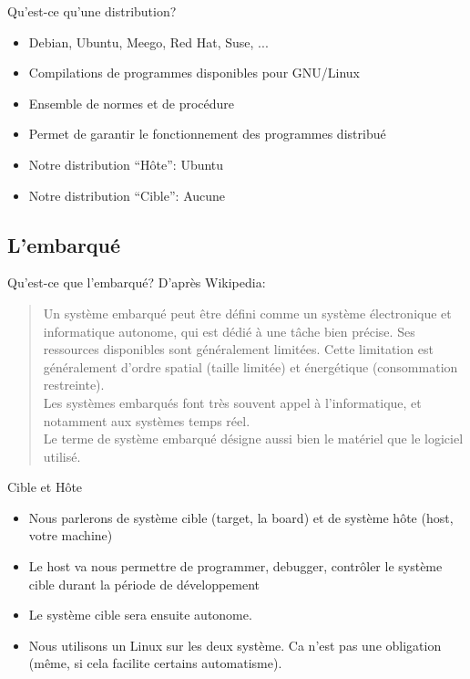 \begin{frame}{Qu'est-ce qu'une distribution?}
  \begin{itemize}
  \item Debian, Ubuntu, Meego,  Red Hat, Suse, ... 
  \item Compilations de programmes disponibles pour GNU/Linux
  \item Ensemble de normes et de procédure
  \item Permet de garantir le fonctionnement des programmes distribué
  \item Notre distribution ``Hôte'': Ubuntu %
  \item Notre distribution ``Cible'': Aucune
  \end{itemize}
\end{frame}

\subsection{L'embarqué}

\begin{frame}{Qu'est-ce que l'embarqué?}
  D'après Wikipedia:
  \begin{quote}
    \justify  Un système embarqué  peut être  défini comme  un système
    électronique et  informatique autonome, qui est dédié  à une tâche
    bien  précise.   Ses   ressources  disponibles  sont  généralement
    limitées.   Cette  limitation  est  généralement  d'ordre  spatial
    (taille limitée) et énergétique (consommation restreinte).
    \\[2ex]
    Les systèmes  embarqués font très souvent  appel à l'informatique,
    et notamment aux systèmes temps réel.
    \\[2ex]
    Le terme de système embarqué désigne aussi bien le matériel que le
    logiciel utilisé.
  \end{quote}
\end{frame}

\begin{frame}{Cible et Hôte}
  \begin{itemize}
  \item  Nous parlerons  de système  cible  (target, la  board) et  de
    système hôte (host, votre machine)
  \item Le  host va nous permettre de  programmer, debugger, contrôler
    le système cible durant la période de développement
  \item Le système cible sera ensuite autonome.
  \item Nous utilisons un Linux sur les deux système. Ca n'est pas une
    obligation (même, si cela facilite certains automatisme).
  \end{itemize}
\end{frame}

